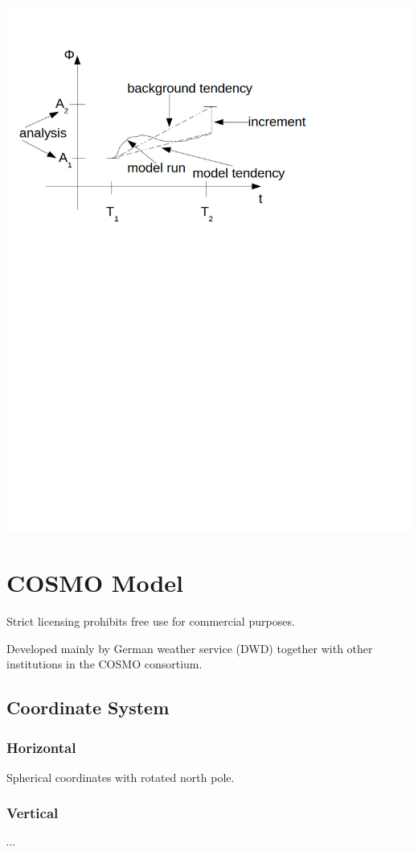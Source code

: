 \includegraphics[scale=0.9]{./img/sketch3.png} 

\pagebreak
\section{COSMO Model}
\p
Strict licensing prohibits free use for commercial purposes.

Developed mainly by German weather service (DWD) together with other institutions in the COSMO consortium.

\subsection{Coordinate System}
\subsubsection{Horizontal}
\p
Spherical coordinates with rotated north pole.
\subsubsection{Vertical}
\p
$\cdots$
